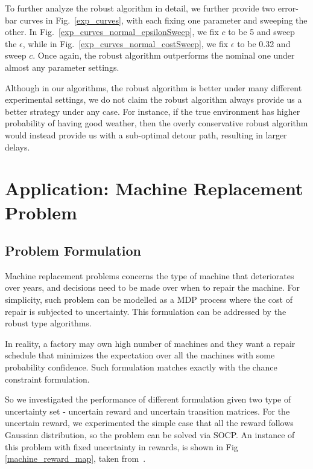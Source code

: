 \documentclass[11pt,reqno]{amsart}
\theoremstyle{definition}
\numberwithin{equation}{section}
\theoremstyle{remark}
\begin{document}
To further analyze the robust algorithm in detail, we further provide two error-bar curves in Fig.~\ref{exp_curves}, with each fixing one parameter and sweeping the other. In Fig.~\ref{exp_curves_normal_epsilonSweep}, we fix $c$ to be 5 and sweep the $\epsilon$, while in Fig.~\ref{exp_curves_normal_costSweep}, we fix $\epsilon$ to be 0.32 and sweep $c$. Once again, the robust algorithm outperforms the nominal one under almost any parameter settings.

\medskip

Although in our algorithms, the robust algorithm is better under many different experimental settings, we do not claim the robust algorithm always provide us a better strategy under any case. For instance, if the true environment has higher probability of having good weather, then the overly conservative robust algorithm would instead provide us with a sub-optimal detour path, resulting in larger delays.


\section{Application: Machine Replacement Problem}


\subsection{Problem Formulation}
Machine replacement problems concerns the type of machine that deteriorates over years, and decisions need to be made over when to repair the machine. For simplicity, such problem can be modelled as a MDP process where the cost of repair is subjected to uncertainty. This formulation can be addressed by the robust type algorithms. 

\medskip

In reality, a factory may own high number of machines and they want a repair schedule that minimizes the expectation over all the machines with some probability confidence. Such formulation matches exactly with the chance constraint formulation. 

\medskip
So we investigated the performance of different formulation given two type of uncertainty set - uncertain reward and uncertain transition matrices. For the uncertain reward, we experimented the simple case that all the reward follows Gaussian distribution, so the problem can be solved via SOCP. An instance of this problem with fixed uncertainty in rewards, is shown in Fig \ref{machine_reward_map}, taken from~\cite{delage2010percentile}. 
\end{document}
